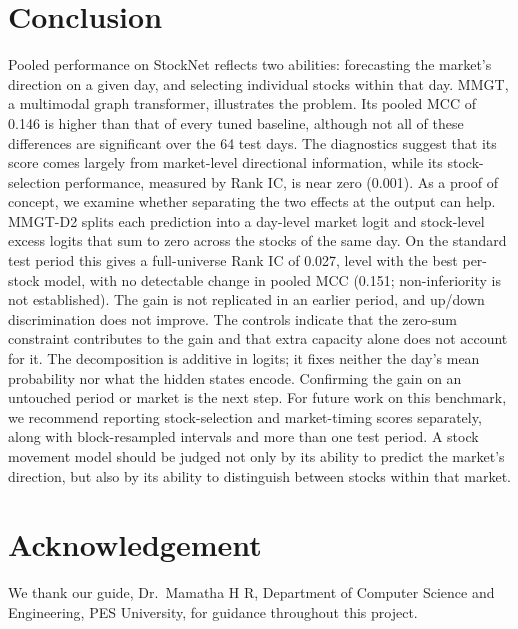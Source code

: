 \documentclass[conference]{IEEEtran}
\begin{document}
\section{Conclusion}

Pooled performance on StockNet reflects two abilities: forecasting the market's direction on a given day, and selecting individual stocks within that day. MMGT, a multimodal graph transformer, illustrates the problem. Its pooled MCC of 0.146 is higher than that of every tuned baseline, although not all of these differences are significant over the 64 test days. The diagnostics suggest that its score comes largely from market-level directional information, while its stock-selection performance, measured by Rank IC, is near zero (0.001). As a proof of concept, we examine whether separating the two effects at the output can help. MMGT-D2 splits each prediction into a day-level market logit and stock-level excess logits that sum to zero across the stocks of the same day. On the standard test period this gives a full-universe Rank IC of 0.027, level with the best per-stock model, with no detectable change in pooled MCC (0.151; non-inferiority is not established). The gain is not replicated in an earlier period, and up/down discrimination does not improve. The controls indicate that the zero-sum constraint contributes to the gain and that extra capacity alone does not account for it. The decomposition is additive in logits; it fixes neither the day's mean probability nor what the hidden states encode. Confirming the gain on an untouched period or market is the next step. For future work on this benchmark, we recommend reporting stock-selection and market-timing scores separately, along with block-resampled intervals and more than one test period. A stock movement model should be judged not only by its ability to predict the market's direction, but also by its ability to distinguish between stocks within that market.

\section*{Acknowledgement}

We thank our guide, Dr.~Mamatha H R, Department of Computer Science and
Engineering, PES University, for guidance throughout this project.
\end{document}
